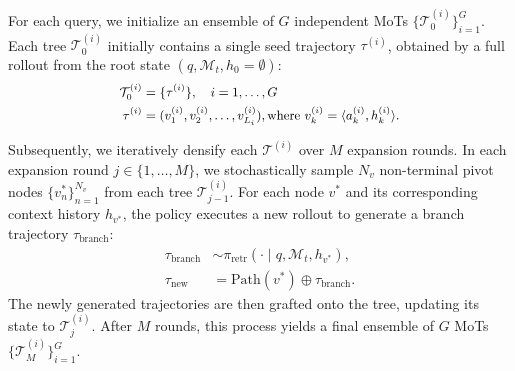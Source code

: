 \documentclass[11pt, a4paper]{lumia}
\begin{document}
For each query, we initialize an ensemble of $G$ independent MoTs $\{ \mathcal{T}^{(i)}_0 \}_{i=1}^G$.
Each tree $\mathcal{T}^{(i)}_0$ initially contains a single seed trajectory $\tau^{(i)}$, obtained by a full rollout from the root state $(q, \mathcal{M}_t, h_{0}=\emptyset)$:
\begin{equation}
\small
\begin{aligned}
\mathcal{T}^{(i)}_0 &= \{ \tau^{(i)} \}, \quad i=1, \dots, G \\
\tau^{(i)} &= (v^{(i)}_1, v^{(i)}_2, \dots, v^{(i)}_{L_i}), \text{where } v^{(i)}_k = \langle a^{(i)}_k, h^{(i)}_k \rangle.
\end{aligned}
\end{equation}

Subsequently, we iteratively densify each $\mathcal{T}^{(i)}$ over $M$ expansion rounds.
In each expansion round $j \in \{1, \dots, M\}$, we stochastically sample $N_v$ non-terminal pivot nodes $\{v^*_n\}_{n=1}^{N_v}$ from each tree $\mathcal{T}^{(i)}_{j-1}$.
For each node $v^*$ and its corresponding context history $h_{v^*}$, the policy executes a new rollout to generate a branch trajectory $\tau_{\text{branch}}$:
\begin{equation}
\begin{aligned}
\tau_{\text{branch}} &\sim \pi_{\text{retr}}(\cdot \mid q, \mathcal{M}_t, h_{v^*}), \\
\tau_{\text{new}} &= \text{Path}(v^*) \oplus \tau_{\text{branch}}.
\end{aligned}
\end{equation}
The newly generated trajectories are then grafted onto the tree, updating its state to $\mathcal{T}^{(i)}_j$. After $M$ rounds, this process yields a final ensemble of $G$ MoTs $\{ \mathcal{T}^{(i)}_M \}_{i=1}^G$.
\end{document}
